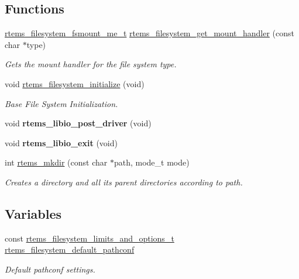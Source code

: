 \subsection*{Functions}
\begin{DoxyCompactItemize}
\item 
\mbox{\hyperlink{group__LibIOFSOps_gab86f790d75005100fc4d847f7cdc8aef}{rtems\+\_\+filesystem\+\_\+fsmount\+\_\+me\+\_\+t}} \mbox{\hyperlink{group__LibIO_ga62474d331c7b110859bcb85ccc85289a}{rtems\+\_\+filesystem\+\_\+get\+\_\+mount\+\_\+handler}} (const char $\ast$type)
\begin{DoxyCompactList}\small\item\em Gets the mount handler for the file system {\itshape type}. \end{DoxyCompactList}\item 
void \mbox{\hyperlink{group__LibIO_gad5344541746c6e86ef313e926ac2d7af}{rtems\+\_\+filesystem\+\_\+initialize}} (void)
\begin{DoxyCompactList}\small\item\em Base File System Initialization. \end{DoxyCompactList}\item 
\mbox{\label{group__LibIO_ga0d879282ab3cfd934178d8ee86de03fe}} 
void {\bfseries rtems\+\_\+libio\+\_\+post\+\_\+driver} (void)
\item 
\mbox{\label{group__LibIO_ga413eb6eee663d9682c64641b2cd0beb0}} 
void {\bfseries rtems\+\_\+libio\+\_\+exit} (void)
\item 
int \mbox{\hyperlink{group__LibIO_gad15bb6c81ba9ed35ec75103d13bde734}{rtems\+\_\+mkdir}} (const char $\ast$path, mode\+\_\+t mode)
\begin{DoxyCompactList}\small\item\em Creates a directory and all its parent directories according to {\itshape path}. \end{DoxyCompactList}\end{DoxyCompactItemize}
\subsection*{Variables}
\begin{DoxyCompactItemize}
\item 
const \mbox{\hyperlink{structrtems__filesystem__limits__and__options__t}{rtems\+\_\+filesystem\+\_\+limits\+\_\+and\+\_\+options\+\_\+t}} \mbox{\hyperlink{group__LibIO_gaf623825fb7bd37d1ba06849b57e29db4}{rtems\+\_\+filesystem\+\_\+default\+\_\+pathconf}}
\begin{DoxyCompactList}\small\item\em Default pathconf settings. \end{DoxyCompactList}\end{DoxyCompactItemize}
